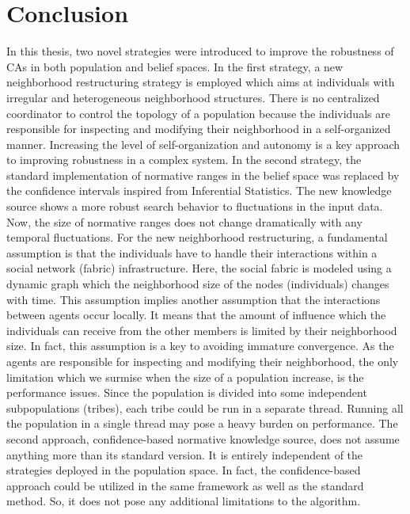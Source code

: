 \label{concl}
\section{Conclusion}
In this thesis, two novel strategies were introduced to improve the robustness of CAs in both population and belief spaces. In the first strategy, a new neighborhood restructuring strategy is employed which aims at individuals with irregular and heterogeneous neighborhood structures. There is no centralized coordinator to control the topology of a population because the individuals are responsible for inspecting and modifying their neighborhood in a self-organized manner. Increasing the level of self-organization and autonomy is a key approach to improving robustness in a complex system.  In the second strategy, the standard implementation of normative ranges in the belief space was replaced by the confidence intervals inspired from Inferential Statistics. The new knowledge source shows a more robust search behavior to fluctuations in the input data. Now, the size of normative ranges does not change dramatically with any temporal fluctuations.\newline
For the new neighborhood restructuring, a fundamental assumption is that the individuals have to handle their interactions within a social network (fabric) infrastructure. Here, the social fabric is modeled using a dynamic graph which the neighborhood size of the nodes (individuals) changes with time. This assumption implies another assumption that the interactions between agents occur locally. It means that the amount of influence which the individuals can receive from the other members is limited by their neighborhood size. In fact, this assumption is a key to avoiding immature convergence. As the agents are responsible for inspecting and modifying their neighborhood, the only limitation which we surmise when the size of a population increase, is the performance issues. Since the population is divided into some independent subpopulations (tribes), each tribe could be run in a separate thread. Running all the population in a single thread may pose a heavy burden on performance.\newline
The second approach, confidence-based normative knowledge source, does not assume anything more than its standard version. It is entirely independent of the strategies deployed in the population space. In fact, the confidence-based approach could be utilized in the same framework as well as the standard method. So, it does not pose any additional limitations to the algorithm.


